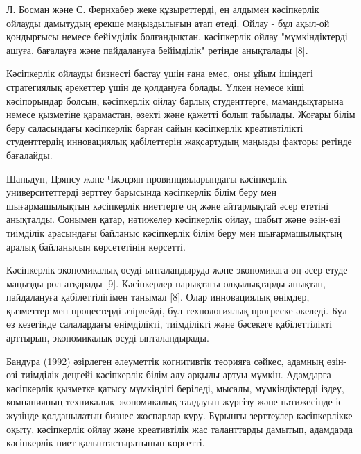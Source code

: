 Л. Босман және С. Фернхабер жеке құзыреттерді, ең алдымен кәсіпкерлік
ойлауды дамытудың ерекше маңыздылығын атап өтеді. Ойлау - бұл ақыл-ой
қондырғысы немесе бейімділік болғандықтан, кәсіпкерлік ойлау
"мүмкіндіктерді ашуға, бағалауға және пайдалануға бейімділік" ретінде
анықталады {[}8{]}.

Кәсіпкерлік ойлауды бизнесті бастау үшін ғана емес, оны ұйым ішіндегі
стратегиялық әрекеттер үшін де қолдануға болады. Үлкен немесе кіші
кәсіпорындар болсын, кәсіпкерлік ойлау барлық студенттерге,
мамандықтарына немесе қызметіне қарамастан, өзекті және қажетті болып
табылады. Жоғары білім беру саласындағы кәсіпкерлік барған сайын
кәсіпкерлік креативтілікті студенттердің инновациялық қабілеттерін
жақсартудың маңызды факторы ретінде бағалайды.

Шаньдун, Цзянсу және Чжэцзян провинцияларындағы кәсіпкерлік
университеттерді зерттеу барысында кәсіпкерлік білім беру мен
шығармашылықтың кәсіпкерлік ниеттерге оң және айтарлықтай әсер ететіні
анықталды. Сонымен қатар, нәтижелер кәсіпкерлік ойлау, шабыт және
өзін-өзі тиімділік арасындағы байланыс кәсіпкерлік білім беру мен
шығармашылықтың аралық байланысын көрсететінін көрсетті.

Кәсіпкерлік экономикалық өсуді ынталандыруда және экономикаға оң әсер
етуде маңызды рөл атқарады {[}9{]}. Кәсіпкерлер нарықтағы олқылықтарды
анықтап, пайдалануға қабілеттілігімен танымал {[}8{]}. Олар инновациялық
өнімдер, қызметтер мен процестерді әзірлейді, бұл технологиялық
прогреске әкеледі. Бұл өз кезегінде салалардағы өнімділікті, тиімділікті
және бәсекеге қабілеттілікті арттырып, экономикалық өсуді ынталандырады.

Бандура (1992) әзірлеген әлеуметтік когнитивтік теорияға сәйкес, адамның
өзін-өзі тиімділік деңгейі кәсіпкерлік білім алу арқылы артуы мүмкін.
Адамдарға кәсіпкерлік қызметке қатысу мүмкіндігі беріледі, мысалы,
мүмкіндіктерді іздеу, компанияның техникалық-экономикалық талдауын
жүргізу және нәтижесінде іс жүзінде қолданылатын бизнес-жоспарлар құру.
Бұрынғы зерттеулер кәсіпкерлікке оқыту, кәсіпкерлік ойлау және
креативтілік жас таланттарды дамытып, адамдарда кәсіпкерлік ниет
қалыптастыратынын көрсетті.

